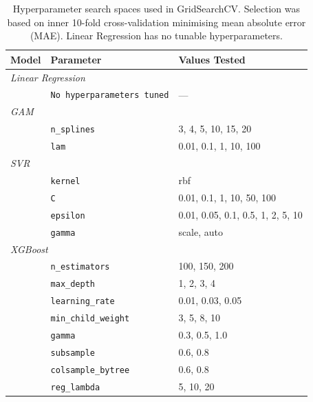 \begin{table}
    \caption{Hyperparameter search spaces used in GridSearchCV. 
             Selection was based on inner 10-fold cross-validation 
             minimising mean absolute error (MAE). Linear Regression 
             has no tunable hyperparameters.}
    \label{tab:hyperparameters}
    \centering
    \small
    \begin{tabular}{lll}
        \toprule
        Model & Parameter & Values Tested \\
        \midrule
        \multicolumn{3}{l}{\textit{Linear Regression}} \\
        & \texttt{No hyperparameters tuned} & — \\
        \midrule
        \multicolumn{3}{l}{\textit{GAM}} \\
        & \texttt{n\_splines} & 3, 4, 5, 10, 15, 20 \\
        & \texttt{lam} & 0.01, 0.1, 1, 10, 100 \\
        \midrule
        \multicolumn{3}{l}{\textit{SVR}} \\
        & \texttt{kernel} & rbf \\
        & \texttt{C} & 0.01, 0.1, 1, 10, 50, 100 \\
        & \texttt{epsilon} & 0.01, 0.05, 0.1, 0.5, 1, 2, 5, 10 \\
        & \texttt{gamma} & scale, auto \\
        \midrule
        \multicolumn{3}{l}{\textit{XGBoost}} \\
        & \texttt{n\_estimators} & 100, 150, 200 \\
        & \texttt{max\_depth} & 1, 2, 3, 4 \\
        & \texttt{learning\_rate} & 0.01, 0.03, 0.05 \\
        & \texttt{min\_child\_weight} & 3, 5, 8, 10 \\
        & \texttt{gamma} & 0.3, 0.5, 1.0 \\
        & \texttt{subsample} & 0.6, 0.8 \\
        & \texttt{colsample\_bytree} & 0.6, 0.8 \\
        & \texttt{reg\_lambda} & 5, 10, 20 \\
                \bottomrule
    \end{tabular}
\end{table}
